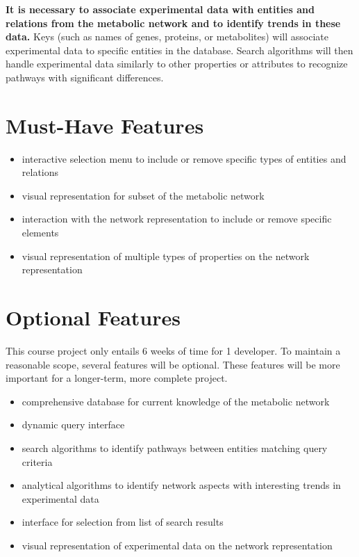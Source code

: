 \textbf{It is necessary to associate experimental data with entities and relations from the metabolic network and to identify trends in these data.}
Keys (such as names of genes, proteins, or metabolites) will associate experimental data to specific entities in the database.
Search algorithms will then handle experimental data similarly to other properties or attributes to recognize pathways with significant differences.

\section{Must-Have Features}

\begin{itemize}
\item interactive selection menu to include or remove specific types of entities and relations
\item visual representation for subset of the metabolic network
\item interaction with the network representation to include or remove specific elements
\item visual representation of multiple types of properties on the network representation
\end{itemize}

\section{Optional Features}

This course project only entails 6 weeks of time for 1 developer.
To maintain a reasonable scope, several features will be optional.
These features will be more important for a longer-term, more complete project.

\begin{itemize}
\item comprehensive database for current knowledge of the metabolic network
\item dynamic query interface
\item search algorithms to identify pathways between entities matching query criteria
\item analytical algorithms to identify network aspects with interesting trends in experimental data
\item interface for selection from list of search results
\item visual representation of experimental data on the network representation
\end{itemize}

